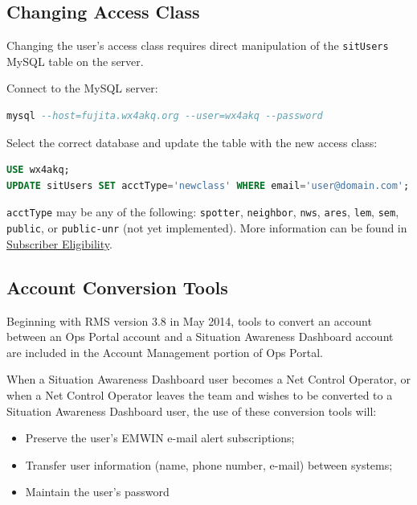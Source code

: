 \documentclass[pdflatex,letterpaper,twoside,12pt]{book}
\begin{document}
\subsection{Changing Access Class}

Changing the user's access class requires direct manipulation of the \verb|sitUsers| MySQL table on the server.

Connect to the MySQL server:

\begin{lstlisting}[language=SQL]
mysql --host=fujita.wx4akq.org --user=wx4akq --password
\end{lstlisting}

Select the correct database and update the table with the new access class:

\begin{lstlisting}[language=SQL]
USE wx4akq;
UPDATE sitUsers SET acctType='newclass' WHERE email='user@domain.com';
\end{lstlisting}

\verb|acctType| may be any of the following:  \verb|spotter|, \verb|neighbor|, \verb|nws|, \verb|ares|, \verb|lem|, \verb|sem|, \verb|public|, or \verb|public-unr| (not yet implemented).  More information can be found in \hyperref[sec:eligibility]{Subscriber Eligibility}.

\subsection{Account Conversion Tools}\label{sit-account-conversion}

Beginning with RMS version 3.8 in May 2014, tools to convert an account between an Ops Portal account and a Situation Awareness Dashboard account are included in the Account Management portion of Ops Portal.

When a Situation Awareness Dashboard user becomes a Net Control Operator, or when a Net Control Operator leaves the team and wishes to be converted to a Situation Awareness Dashboard user, the use of these conversion tools will:

\begin{itemize}
\item Preserve the user's EMWIN e-mail alert subscriptions;
\item Transfer user information (name, phone number, e-mail) between systems;
\item Maintain the user's password
\end{itemize}
\end{document}
